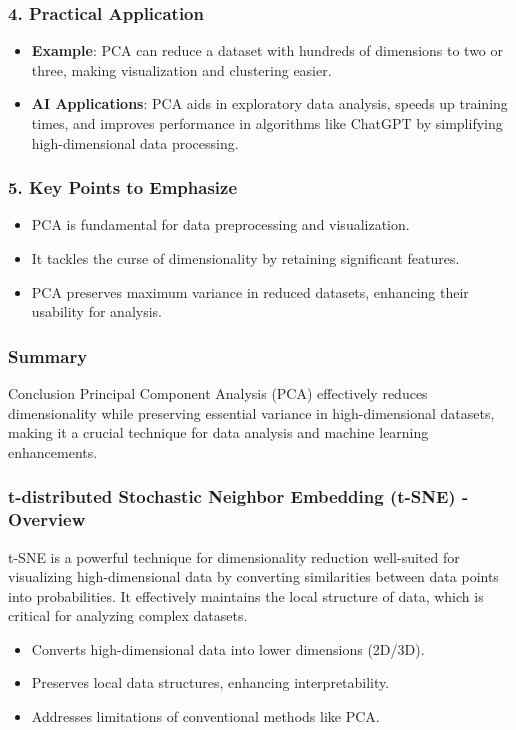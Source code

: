 \documentclass[aspectratio=169]{beamer}
\begin{document}
\begin{frame}[fragile]
    \frametitle{4. Practical Application}
    \begin{itemize}
        \item \textbf{Example}: PCA can reduce a dataset with hundreds of dimensions to two or three, making visualization and clustering easier.
        \item \textbf{AI Applications}: PCA aids in exploratory data analysis, speeds up training times, and improves performance in algorithms like ChatGPT by simplifying high-dimensional data processing.
    \end{itemize}
\end{frame}

\begin{frame}[fragile]
    \frametitle{5. Key Points to Emphasize}
    \begin{itemize}
        \item PCA is fundamental for data preprocessing and visualization.
        \item It tackles the curse of dimensionality by retaining significant features.
        \item PCA preserves maximum variance in reduced datasets, enhancing their usability for analysis.
    \end{itemize}
\end{frame}

\begin{frame}[fragile]
    \frametitle{Summary}
    \begin{block}{Conclusion}
        Principal Component Analysis (PCA) effectively reduces dimensionality while preserving essential variance in high-dimensional datasets, making it a crucial technique for data analysis and machine learning enhancements.
    \end{block}
\end{frame}

\begin{frame}[fragile]
    \frametitle{t-distributed Stochastic Neighbor Embedding (t-SNE) - Overview}
    t-SNE is a powerful technique for dimensionality reduction well-suited for visualizing high-dimensional data by converting similarities between data points into probabilities. It effectively maintains the local structure of data, which is critical for analyzing complex datasets.
    
    \begin{itemize}
        \item Converts high-dimensional data into lower dimensions (2D/3D).
        \item Preserves local data structures, enhancing interpretability.
        \item Addresses limitations of conventional methods like PCA.
    \end{itemize}
\end{frame}
\end{document}
